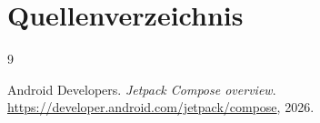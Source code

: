\documentclass{article}
\begin{document}
\section{Quellenverzeichnis}
\begingroup
\renewcommand{\section}[2]{}

\begin{thebibliography}{9}

Android Developers.
\emph{Jetpack Compose overview}.
\url{https://developer.android.com/jetpack/compose}, 2026.

\end{thebibliography}
\endgroup
\end{document}

